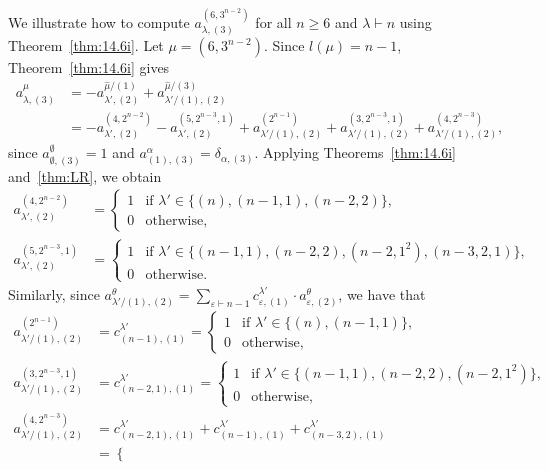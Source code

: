 \begin{example}\label{ex:14.7}
	We illustrate how to compute $a^{(6,3^{n-2})}_{\lambda,(3)}$ for all $n\ge 6$ and $\lambda\vdash n$ using Theorem~\ref{thm:14.6i}. 
	Let $\mu=(6,3^{n-2})$. Since $l(\mu)=n-1$, Theorem~\ref{thm:14.6i} gives
	\begin{align*} a^\mu_{\lambda,(3)}& = - a^{\hat{\mu}/(1)}_{\lambda',(2)} + a^{\hat{\mu}/(3)}_{\lambda'/(1),(2)} \\&= -a^{(4,2^{n-2})}_{\lambda',(2)} - a^{(5,2^{n-3},1)}_{\lambda',(2)} + a^{(2^{n-1})}_{\lambda'/(1),(2)} + a^{(3,2^{n-3},1)}_{\lambda'/(1),(2)} + a^{(4,2^{n-3})}_{\lambda'/(1),(2)}, \end{align*}
	since $a^\emptyset_{\emptyset,(3)}=1$ and $a^\alpha_{(1),(3)}=\delta_{\alpha,(3)}$. Applying Theorems~\ref{thm:14.6i} and~\ref{thm:LR}, we obtain
	\begin{align*}
		a^{(4,2^{n-2})}_{\lambda',(2)} &= \begin{cases} 1 & \text{if }\lambda'\in\{(n),(n-1,1),(n-2,2)\},\\ 0&\text{otherwise},\end{cases}\\
		a^{(5,2^{n-3},1)}_{\lambda',(2)} &= \begin{cases} 1 & \text{if }\lambda'\in\{(n-1,1),(n-2,2),(n-2,1^2),(n-3,2,1)\},\\ 0&\text{otherwise}.\end{cases}
	\end{align*}
	Similarly, since $a^\theta_{\lambda'/(1),(2)} = \sum_{\varepsilon\vdash n-1}c^{\lambda'}_{\varepsilon,(1)}\cdot a^\theta_{\varepsilon,(2)}$, we have that
	\begin{align*}
		a^{(2^{n-1})}_{\lambda'/(1),(2)} &= c^{\lambda'}_{(n-1),(1)} = \begin{cases}
			1 & \text{if }\lambda'\in\{(n),(n-1,1)\},\\ 0&\text{otherwise},\end{cases}\\
		a^{(3,2^{n-3},1)}_{\lambda'/(1),(2)} &= c^{\lambda'}_{(n-2,1),(1)} = \begin{cases}
			1 & \text{if }\lambda'\in\{(n-1,1),(n-2,2),(n-2,1^2)\},\\ 0&\text{otherwise},\end{cases}\\
		a^{(4,2^{n-3})}_{\lambda'/(1),(2)} &= c^{\lambda'}_{(n-2,1),(1)} + c^{\lambda'}_{(n-1),(1)} + c^{\lambda'}_{(n-3,2),(1)}\\
		&= \begin{cases}

\end{cases}
\end{align*}
\end{example}
